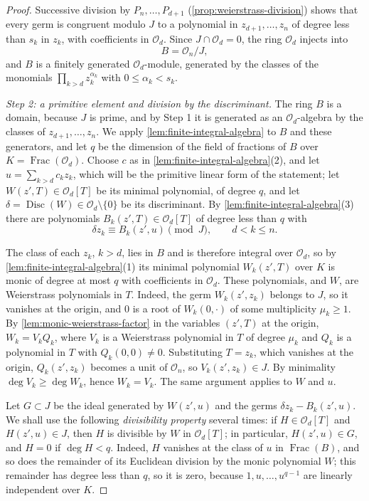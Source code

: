 \begin{proof}
Successive division by $P_n,\ldots,P_{d+1}$ (\cref{prop:weierstrass-division}) shows that every germ is congruent modulo $J$ to a polynomial in $z_{d+1},\ldots,z_n$ of degree less than $s_k$ in $z_k$, with coefficients in $\mathcal O_d$. Since $J\cap\mathcal O_d=0$, the ring $\mathcal O_d$ injects into
\[
 B=\mathcal O_n/J,
\]
and $B$ is a finitely generated $\mathcal O_d$-module, generated by the classes of the monomials $\prod_{k>d}z_k^{\alpha_k}$ with $0\le\alpha_k<s_k$.

\emph{Step 2: a primitive element and division by the discriminant.} The ring $B$ is a domain, because $J$ is prime, and by Step 1 it is generated as an $\mathcal O_d$-algebra by the classes of $z_{d+1},\ldots,z_n$. We apply \cref{lem:finite-integral-algebra} to $B$ and these generators, and let $q$ be the dimension of the field of fractions of $B$ over $K=\operatorname{Frac}(\mathcal O_d)$. Choose $c$ as in \cref{lem:finite-integral-algebra}(2), and let $u=\sum_{k>d}c_kz_k$, which will be the primitive linear form of the statement; let $W(z',T)\in\mathcal O_d[T]$ be its minimal polynomial, of degree $q$, and let $\delta=\operatorname{Disc}(W)\in\mathcal O_d\setminus\{0\}$ be its discriminant. By \cref{lem:finite-integral-algebra}(3) there are polynomials $B_k(z',T)\in\mathcal O_d[T]$ of degree less than $q$ with
\[
 \delta z_k\equiv B_k(z',u)\pmod J,\qquad d<k\leq n.
\]

The class of each $z_k$, $k>d$, lies in $B$ and is therefore integral over $\mathcal O_d$, so by \cref{lem:finite-integral-algebra}(1) its minimal polynomial $W_k(z',T)$ over $K$ is monic of degree at most $q$ with coefficients in $\mathcal O_d$. These polynomials, and $W$, are Weierstrass polynomials in $T$. Indeed, the germ $W_k(z',z_k)$ belongs to $J$, so it vanishes at the origin, and $0$ is a root of $W_k(0,\cdot)$ of some multiplicity $\mu_k\geq1$. By \cref{lem:monic-weierstrass-factor} in the variables $(z',T)$ at the origin, $W_k=V_kQ_k$, where $V_k$ is a Weierstrass polynomial in $T$ of degree $\mu_k$ and $Q_k$ is a polynomial in $T$ with $Q_k(0,0)\neq0$. Substituting $T=z_k$, which vanishes at the origin, $Q_k(z',z_k)$ becomes a unit of $\mathcal O_n$, so $V_k(z',z_k)\in J$. By minimality $\deg V_k\geq\deg W_k$, hence $W_k=V_k$. The same argument applies to $W$ and $u$.

Let $G\subset J$ be the ideal generated by $W(z',u)$ and the germs $\delta z_k-B_k(z',u)$. We shall use the following \emph{divisibility property} several times: if $H\in\mathcal O_d[T]$ and $H(z',u)\in J$, then $H$ is divisible by $W$ in $\mathcal O_d[T]$; in particular, $H(z',u)\in G$, and $H=0$ if $\deg H<q$. Indeed, $H$ vanishes at the class of $u$ in $\operatorname{Frac}(B)$, and so does the remainder of its Euclidean division by the monic polynomial $W$; this remainder has degree less than $q$, so it is zero, because $1,u,\ldots,u^{q-1}$ are linearly independent over $K$.


\end{proof}
